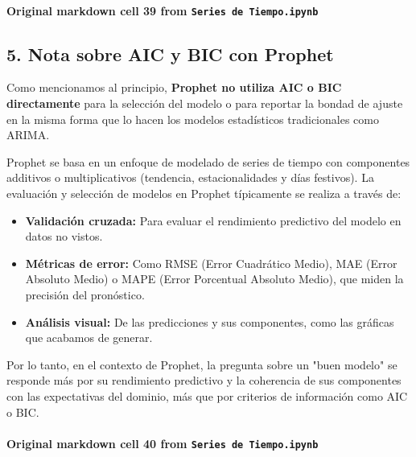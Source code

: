 \documentclass[
  11pt,
]{article}
\providecommand{\tightlist}{%
  \setlength{\itemsep}{0pt}\setlength{\parskip}{0pt}}
\begin{document}
\paragraph{\texorpdfstring{Original markdown cell 39 from \texttt{Series\ de\ Tiempo.ipynb}}{Original markdown cell 39 from Series de Tiempo.ipynb}}\label{original-markdown-cell-39-from-series-de-tiempoipynb}

\subsection{5. Nota sobre AIC y BIC con Prophet}\label{5-nota-sobre-aic-y-bic-con-prophet}

Como mencionamos al principio, \textbf{Prophet no utiliza AIC o BIC directamente} para la selección del modelo o para reportar la bondad de ajuste en la misma forma que lo hacen los modelos estadísticos tradicionales como ARIMA.

Prophet se basa en un enfoque de modelado de series de tiempo con componentes additivos o multiplicativos (tendencia, estacionalidades y días festivos). La evaluación y selección de modelos en Prophet típicamente se realiza a través de:

\begin{itemize}
\tightlist
\item
  \textbf{Validación cruzada:} Para evaluar el rendimiento predictivo del modelo en datos no vistos.
\item
  \textbf{Métricas de error:} Como RMSE (Error Cuadrático Medio), MAE (Error Absoluto Medio) o MAPE (Error Porcentual Absoluto Medio), que miden la precisión del pronóstico.
\item
  \textbf{Análisis visual:} De las predicciones y sus componentes, como las gráficas que acabamos de generar.
\end{itemize}

Por lo tanto, en el contexto de Prophet, la pregunta sobre un "buen modelo" se responde más por su rendimiento predictivo y la coherencia de sus componentes con las expectativas del dominio, más que por criterios de información como AIC o BIC.

\paragraph{\texorpdfstring{Original markdown cell 40 from \texttt{Series\ de\ Tiempo.ipynb}}{Original markdown cell 40 from Series de Tiempo.ipynb}}\label{original-markdown-cell-40-from-series-de-tiempoipynb}
\end{document}
